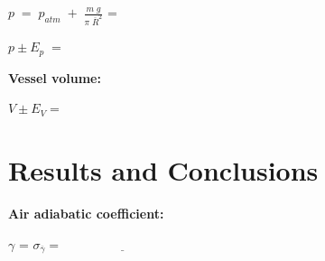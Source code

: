 \documentclass{article}
\begin{document}
\vspace{5mm}

$p \; = \; p_{atm} \; + \; \frac{m \; g}{\pi \;
\overline{R}^2}$ = \underline{\hspace{4cm}}

\vspace{5mm}

$p\pm E_p \; = $ \underline{\hspace{4cm}}

\vspace{5mm}


{\bf Vessel volume:}

\vspace{5mm}

$V \pm E_V = $ \underline{\hspace{3cm}}
%


\section{Results and Conclusions}

\vspace{10mm}

\textbf{Air adiabatic coefficient:}

\vspace{5mm}
{\LARGE
$\gamma$ = \underline{\hspace{4cm}}
\hspace{1cm}
$\sigma_{\overline{\gamma}}=\underline{\hspace{4cm}}$
}
\nocite{*}






\end{document}
